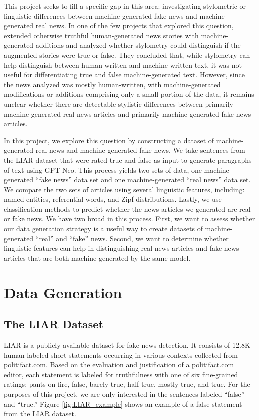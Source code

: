 \documentclass[11pt,a4paper]{article}
\begin{document}
This project seeks to fill a specific gap in this area: investigating stylometric or linguistic differences between machine-generated fake news and machine-generated real news. In one of the few projects that explored this question, \citet{schuster2020limitations} extended otherwise truthful human-generated news stories with machine-generated additions and analyzed whether stylometry could distinguish if the augmented stories were true or false. They concluded that, while stylometry can help distinguish between human-written and machine-written text, it was not useful for differentiating true and false machine-generated text. However, since the news \citet{schuster2020limitations} analyzed was mostly human-written, with machine-generated modifications or additions comprising only a small portion of the data, it remains unclear whether there are detectable stylistic differences between primarily machine-generated real news articles and primarily machine-generated fake news articles. 

In this project, we explore this question by constructing a dataset of machine-generated real news and machine-generated fake news. We take sentences from the LIAR dataset \citep{wang2017liar} that were rated true and false as input to generate paragraphs of text using GPT-Neo. This process yields two sets of data, one machine-generated ``fake news'' data set and one machine-generated ``real news'' data set. We compare the two sets of articles using several linguistic features, including: named entities, referential words, and Zipf distributions. Lastly, we use classification methods to predict whether the news articles we generated are real or fake news. We have two broad in this process. First, we want to assess whether our data generation strategy is a useful way to create datasets of machine-generated ``real'' and ``fake'' news. Second, we want to determine whether linguistic features can help in distinguishing real news articles and fake news articles that are both machine-generated by the same model. 

\section{Data Generation}
\subsection{The LIAR Dataset}
LIAR \citep{wang2017liar} is a publicly available dataset for fake news detection. It consists of 12.8K human-labeled short statements occurring in various contexts collected from \url{politifact.com}. Based on the evaluation and justification of a \url{politifact.com} editor, each statement is labeled for truthfulness with one of six fine-grained ratings: pants on fire, false, barely true, half true, mostly true, and true. For the purposes of this project, we are only interested in the sentences labeled ``false'' and ``true.'' Figure \ref{fig:LIAR_example} shows an example of a false statement from the LIAR dataset. 
\end{document}
